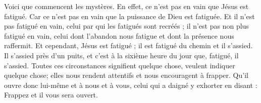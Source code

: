 Voici que commencent les mystères. En effet, ce n’est pas en vain que Jésus est fatigué. Car ce n’est pas en vain que la puissance de Dieu est fatiguée. Et il n’est pas fatigué en vain, celui par qui les fatigués sont recréés ; il n’est pas non plus fatigué en vain, celui dont l’abandon nous fatigue et dont la présence nous raffermit. Et cependant, Jésus est fatigué ; il est fatigué du chemin et il s’assied. Il s’assied près d’un puits, et c’est à la sixième heure du jour que, fatigué, il s’assied. Toutes ces circonstances signifient quelque chose, veulent indiquer quelque chose; elles nous rendent attentifs et nous encouragent à frapper. Qu’il ouvre donc lui-même et à nous et à vous, celui qui a daigné y exhorter en disant : Frappez et il vous sera ouvert.
